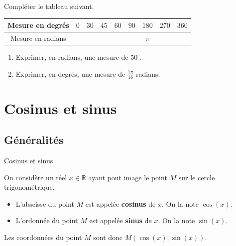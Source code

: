 \documentclass[11pt]{article}
\begin{document}
\begin{app}
 Compléter le tableau suivant. 
\def\arraystretch{1.5}
\begin{tabular}{|c|c|c|c|c|c|c|c|c|}
  \hline
  Mesure en degrés & $0$ & $30$ & $45$ & $60$ & $90$ & $180$ & $270$ & $360$ \\
  \hline
  Mesure en radians & & & & & & $\pi$ & & \\
  \hline
\end{tabular}
\end{app}

\begin{app}
  \begin{enumerate}
    \item Exprimer, en radians, une mesure de $50^\circ$.
    \item Exprimer, en degrés, une mesure de $\frac{7\pi}{16}$ radians.
  \end{enumerate}
\end{app}

\section{Cosinus et sinus}
\subsection{Généralités}
\begin{defi}{Cosinus et sinus}~\\[-5mm]
  \begin{minipage}{.6\textwidth}
  On considère un réel $x\in\mathbb{R}$ ayant pout image le point $M$ sur le
  cercle trigonométrique.
  \begin{itemize}
    \item L'abscisse du point $M$ est appelée \textbf{cosinus} de $x$. On la
      note $\cos(x)$.
    \item L'ordonnée du point $M$ est appelée \textbf{sinus} de $x$. On la note
      $\sin(x)$.
  \end{itemize}
  Les coordonnées du point $M$ sont donc $M(\cos(x); \sin(x))$.
\end{minipage}
  \begin{minipage}{.4\textwidth}
    \begin{center}
    \end{center}
    \end{minipage}
\end{defi}
\end{document}
